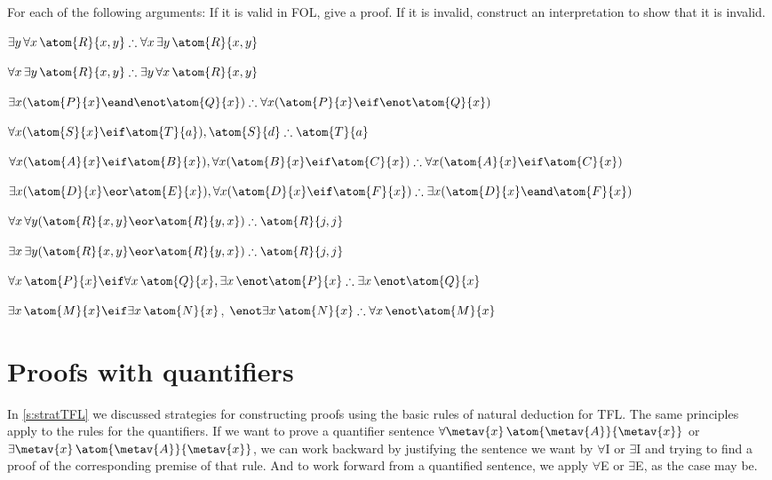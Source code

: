 \solutions
\problempart
\label{pr.FOLvalidornot}
For each of the following arguments: If it is valid in FOL, give a proof. If it is invalid, construct an interpretation to show that it is invalid.
\begin{compactlist}
\item $\exists y\,\forall x\,\atom{R}{x,y} \therefore \forall x\,\exists y\,\atom{R}{x,y}$
\item $\forall x\,\exists y\,\atom{R}{x,y} \therefore  \exists y\,\forall x\,\atom{R}{x,y}$
\item $\exists x(\atom{P}{x} \eand \enot \atom{Q}{x}) \therefore \forall x(\atom{P}{x} \eif \enot \atom{Q}{x})$
\item $\forall x(\atom{S}{x} \eif \atom{T}{a}), \atom{S}{d} \therefore \atom{T}{a}$
\item $\forall x(\atom{A}{x}\eif \atom{B}{x}), \forall x(\atom{B}{x} \eif \atom{C}{x}) \therefore \forall x(\atom{A}{x} \eif \atom{C}{x})$
\item $\exists x(\atom{D}{x} \eor \atom{E}{x}), \forall x(\atom{D}{x} \eif \atom{F}{x}) \therefore \exists x(\atom{D}{x} \eand \atom{F}{x})$
\item $\forall x\,\forall y(\atom{R}{x,y} \eor \atom{R}{y,x}) \therefore \atom{R}{j,j}$
\item $\exists x\,\exists y(\atom{R}{x,y} \eor \atom{R}{y,x}) \therefore \atom{R}{j,j}$
\item $\forall x\,\atom{P}{x} \eif \forall x\,\atom{Q}{x}, \exists x\, \enot\atom{P}{x} \therefore \exists x\, \enot \atom{Q}{x}$
\item $\exists x\,\atom{M}{x} \eif \exists x\,\atom{N}{x}$, $\enot \exists x\,\atom{N}{x}\therefore  \forall x\, \enot \atom{M}{x}$
\end{compactlist}

\chapter{Proofs with quantifiers}

In \cref{s:stratTFL} we discussed strategies for constructing proofs
using the basic rules of natural deduction for TFL. The same
principles apply to the rules for the quantifiers. If we want to prove
a quantifier sentence $\forall \metav{x}\,
\atom{\metav{A}}{\metav{x}}$ or $\exists \metav{x}\,
\atom{\metav{A}}{\metav{x}}$, we can work backward by justifying the
sentence we want by $\forall$I or $\exists$I and trying to find a
proof of the corresponding premise of that rule. And to work forward
from a quantified sentence, we apply $\forall$E or $\exists$E, as the
case may be.

